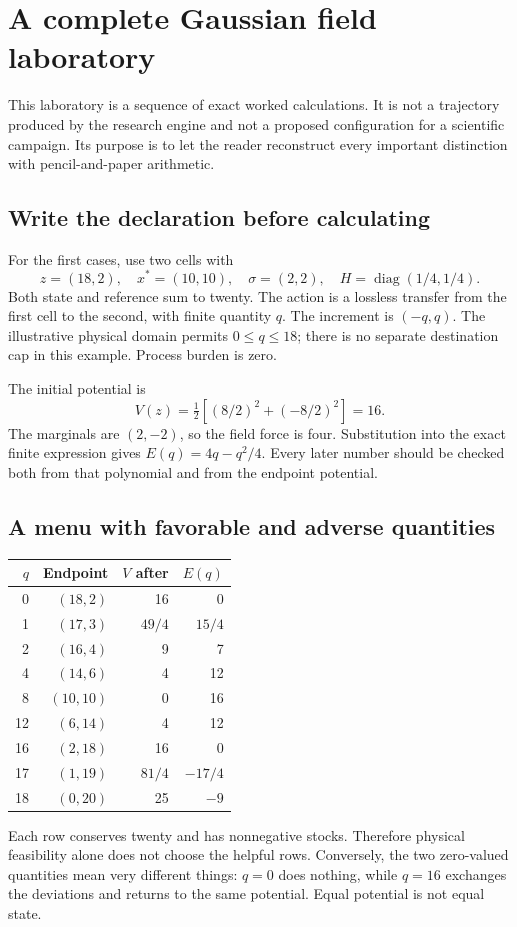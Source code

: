 \chapter{A complete Gaussian field laboratory}\label{ch:lab}
This laboratory is a sequence of exact worked calculations. It is not a
trajectory produced by the research engine and not a proposed configuration
for a scientific campaign. Its purpose is to let the reader reconstruct
every important distinction with pencil-and-paper arithmetic.

\section{Write the declaration before calculating}
For the first cases, use two cells with
\begin{equation}
 z=(18,2),\quad x^*=(10,10),\quad\sigma=(2,2),
 \quad H=\operatorname{diag}(1/4,1/4).
\end{equation}
Both state and reference sum to twenty. The action is a lossless transfer
from the first cell to the second, with finite quantity $q$. The increment
is $(-q,q)$. The illustrative physical domain permits $0\leq q\leq18$;
there is no separate destination cap in this example. Process burden is zero.

The initial potential is
\begin{equation}
 V(z)=\tfrac12[(8/2)^2+(-8/2)^2]=16.
\end{equation}
The marginals are $(2,-2)$, so the field force is four. Substitution into
the exact finite expression gives $E(q)=4q-q^2/4$. Every later number
should be checked both from that polynomial and from the endpoint potential.

\section{A menu with favorable and adverse quantities}
\begin{center}
\begin{tabular}{rrrr}
\toprule $q$ & Endpoint & $V$ after & $E(q)$\\\midrule
0 & $(18,2)$ & 16 & 0\\
1 & $(17,3)$ & $49/4$ & $15/4$\\
2 & $(16,4)$ & 9 & 7\\
4 & $(14,6)$ & 4 & 12\\
8 & $(10,10)$ & 0 & 16\\
12 & $(6,14)$ & 4 & 12\\
16 & $(2,18)$ & 16 & 0\\
17 & $(1,19)$ & $81/4$ & $-17/4$\\
18 & $(0,20)$ & 25 & $-9$\\\bottomrule
\end{tabular}
\end{center}
Each row conserves twenty and has nonnegative stocks. Therefore physical
feasibility alone does not choose the helpful rows. Conversely, the two
zero-valued quantities mean very different things: $q=0$ does nothing,
while $q=16$ exchanges the deviations and returns to the same potential.
Equal potential is not equal state.


